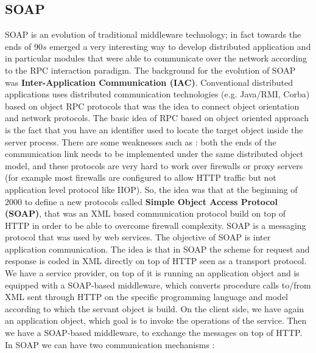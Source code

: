 \subsection{SOAP}
SOAP is an evolution of traditional middleware technology; in fact towards the ends of $90s$ emerged a very interesting way to develop distributed application and in particular modules that were able to communicate over the network according to the RPC interaction paradigm. The background for the evolution of SOAP was \textbf{Inter-Application Communication (IAC)}. Conventional distributed applications uses distributed communication technologies (e.g. Java/RMI, Corba) based on object RPC protocols that was the idea to connect object orientation and network protocols. The basic idea of RPC based on object oriented approach is the fact that you have an identifier used to locate the target object inside the server process. There are some weaknesses such as : both the ends of the communication link needs to be implemented under the same distributed object model, and these protocols are very hard to work over firewalls or proxy servers (for example most firewalls are configured to allow HTTP traffic but not application level protocol like IIOP). So, the idea was that at the beginning of $2000$ to define a new protocols called \textbf{Simple Object Access Protocol (SOAP)}, that was an XML based communication protocol build on top of HTTP in order to be able to overcome firewall complexity. SOAP is a messaging protocol that was used by web services. The objective of SOAP is inter application communication. The idea is that in SOAP the scheme for request and response is coded in XML directly on top of HTTP seen as a transport protocol. We have a service provider, on top of it is running an application object and is equipped with a SOAP-based middleware, which converts procedure calls to/from XML sent through HTTP on the specific programming language and model according to which the servant object is build. On the client side, we have again an application object, which goal is to invoke the operations of the service. Then we have a SOAP-based middleware, to exchange the messages on top of HTTP. In SOAP we can have two communication mechanisms :
